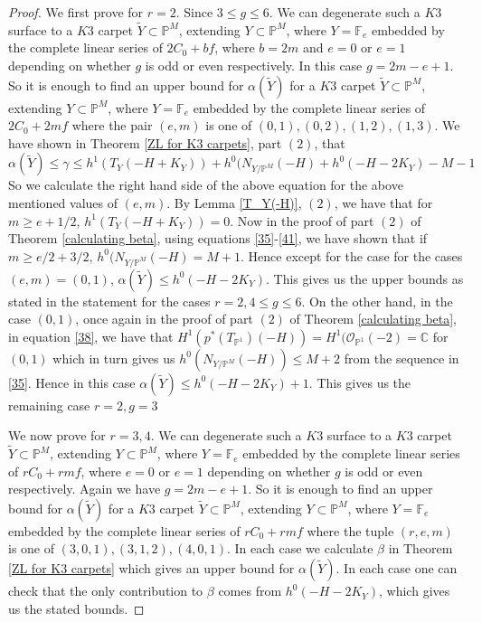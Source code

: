 \documentclass[11pt,twoside]{amsart}
\theoremstyle{plain}
\numberwithin{equation}{section}
\theoremstyle{definition}
\begin{document}
\begin{proof}
We first prove for $r = 2$. Since $3 \leq g \leq 6$. We can degenerate such a $K3$ surface to a $K3$ carpet $\widetilde{Y} \subset \mathbb{P}^M$, extending $Y \subset \mathbb{P}^M$, where $Y = \mathbb{F}_e$ embedded by the complete linear series of $2C_0+bf$, where $b = 2m$ and $e = 0$ or $e = 1$ depending on whether $g$ is odd or even respectively. In this case $g = 2m-e+1$. So it is enough to find an upper bound for $\alpha(\widetilde{Y})$ for a $K3$ carpet $\widetilde{Y} \subset \mathbb{P}^M$, extending $Y \subset \mathbb{P}^M$, where $Y = \mathbb{F}_e$ embedded by the complete linear series of $2C_0+2mf$ where the pair $(e,m)$ is one of $(0,1), (0,2), (1,2), (1,3)$. We have shown in Theorem \ref{ZL for K3 carpets}, part $(2)$, that $$\alpha(\widetilde{Y})  \leq  \gamma \leq h^1(T_Y(-H+K_Y))+h^0(N_{Y/\mathbb{P}^M}(-H)+h^0(-H-2K_Y)-M-1 $$
So we calculate the right hand side of the above equation for the above mentioned values of $(e,m)$. By Lemma \ref{T_Y(-H)}, $(2)$, we have that for $m \geq e+1/2$, $h^1(T_Y(-H+K_Y)) = 0$. Now in the proof of part $(2)$ of Theorem \ref{calculating beta}, using equations \ref{35}-\ref{41}, we have shown that if $m \geq e/2+3/2$, $h^0(N_{Y/\mathbb{P}^M}(-H) = M+1$. Hence except for the case for the cases $(e,m) = (0,1)$, $\alpha(\widetilde{Y}) \leq h^0(-H-2K_Y)$. This gives us the upper bounds as stated in the statement for the cases $r = 2, 4 \leq g \leq 6$. On the other hand, in the case $(0,1)$, once again in the proof of part $(2)$ of Theorem \ref{calculating beta}, in equation \ref{38}, we have that $H^1(p^*(T_{\mathbb{P}^1})(-H)) = H^1(\mathcal{O}_{\mathbb{P}^1}(-2) = \mathbb{C}$ for $(0,1)$ 
which in turn gives us $h^0(N_{Y/\mathbb{P}^M}(-H)) \leq M+2$ 
from the sequence in \ref{35}. Hence in this case $\alpha(\widetilde{Y}) \leq h^0(-H-2K_Y)+1$.
This gives us the remaining case $r = 2, g = 3$ 

We now prove for $r = 3,4$. We can degenerate such a $K3$ surface to a $K3$ carpet $\widetilde{Y} \subset \mathbb{P}^M$, extending $Y \subset \mathbb{P}^M$, where $Y = \mathbb{F}_e$ embedded by the complete linear series of $rC_0+rmf$, where $e = 0$ or $e = 1$ depending on whether $g$ is odd or even respectively. Again we have $g = 2m-e+1$. So it is enough to find an upper bound for $\alpha(\widetilde{Y})$ for a $K3$ carpet $\widetilde{Y} \subset \mathbb{P}^M$, extending $Y \subset \mathbb{P}^M$, where $Y = \mathbb{F}_e$ embedded by the complete linear series of $rC_0+rmf$ where the tuple $(r,e,m)$ is one of $(3,0,1), (3,1,2), (4,0,1)$. In each case we calculate $\beta$ in Theorem \ref{ZL for K3 carpets} which gives an upper bound for $\alpha(\widetilde{Y})$. In each case 
one can check that the only contribution to $\beta$ comes from $h^0(-H-2K_Y)$, which gives us the stated bounds. 
\end{proof}
\end{document}
